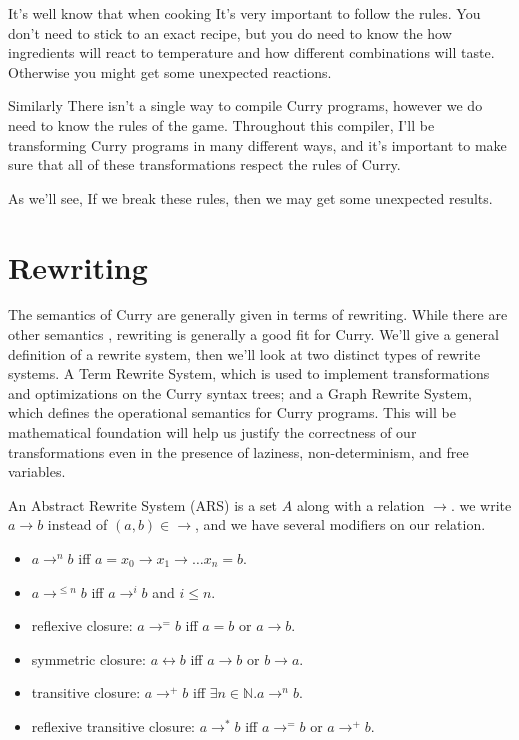 \documentclass{article}
\def\N{\mathbb{N}}
\begin{document}
It's well know that when cooking It's very important to follow the rules.
You don't need to stick to an exact recipe, 
but you do need to know the how ingredients will react to temperature
and how different combinations will taste.
Otherwise you might get some unexpected reactions.

Similarly There isn't a single way to compile Curry programs,
however we do need to know the rules of the game.
Throughout this compiler, I'll be transforming Curry programs
in many different ways, and it's important to make sure that all
of these transformations respect the rules of Curry.

As we'll see, If we break these rules, 
then we may get some unexpected results.

\section{Rewriting}
The semantics of Curry are generally given in terms of rewriting.
\cite{?}
While there are other semantics \cite{?}, 
rewriting is generally a good fit for Curry.
We'll give a general definition of a rewrite system,
then we'll look at two distinct types of rewrite systems.
A Term Rewrite System, which is used to implement transformations and optimizations
on the Curry syntax trees;
and a Graph Rewrite System, which defines the operational semantics for Curry programs.
This will be mathematical foundation will help us justify the correctness of our transformations
even in the presence of laziness, non-determinism, and free variables.

An Abstract Rewrite System (ARS) is a set $A$ along with a relation $\rightarrow$.
we write $a \rightarrow b$ instead of $(a,b) \in \rightarrow$, and we have several modifiers on our relation.
\begin{itemize}
    \item $a \rightarrow^n b$ iff $a = x_0 \rightarrow x_1 \rightarrow \ldots x_n = b$.
    \item $a \rightarrow^{\le n} b$ iff $a \rightarrow^i b$ and $i \leq n$.
    \item reflexive closure: $a \rightarrow^= b$ iff $a = b$ or $a \rightarrow b$.
    \item symmetric closure: $a \leftrightarrow b$ iff $a \rightarrow b$ or $b \rightarrow a$.
    \item transitive closure: $a \rightarrow^+ b$ iff $\exists n\in \N. a \rightarrow^n b$.
    \item reflexive transitive closure: $a \rightarrow^* b$ iff $a \rightarrow^= b$ or $a \rightarrow^+ b$.
\end{itemize}
\end{document}
